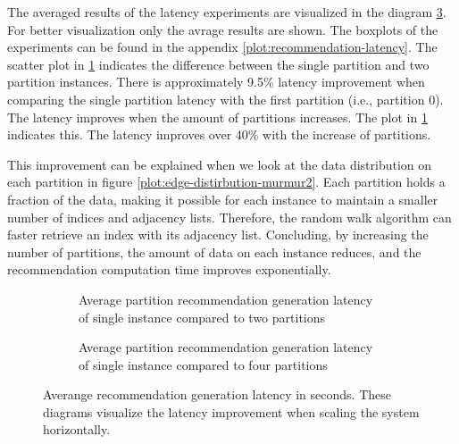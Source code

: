 The averaged results of the latency experiments are visualized in the diagram \ref{plot:average-recommendation-latency}. For better visualization only the avrage results are shown. The boxplots of the experiments can be found in the appendix \ref{plot:recommendation-latency}. The scatter plot in \ref{plot:average-recommendation-latency-two-partitions} indicates the difference between the single partition and two partition instances. There is approximately 9.5\% latency improvement when comparing the single partition latency with the first partition (i.e., partition 0). The latency improves when the amount of partitions increases. The plot in \ref{plot:average-recommendation-latency-two-partitions} indicates this. The latency improves over 40\% with the increase of partitions.

This improvement can be explained when we look at the data distribution on each partition in figure \ref{plot:edge-distirbution-murmur2}. Each partition holds a fraction of the data, making it possible for each instance to maintain a smaller number of indices and adjacency lists. Therefore, the random walk algorithm can faster retrieve an index with its adjacency list. Concluding, by increasing the number of partitions, the amount of data on each instance reduces, and the recommendation computation time improves exponentially.


\begin{figure}[!htb]
    \centering
    \begin{subfigure}{\textwidth}
        \centering
        
        \caption{Average partition recommendation generation latency of single instance compared to two partitions}
        \label{plot:average-recommendation-latency-two-partitions}
    \end{subfigure}\qquad

    \begin{subfigure}{\textwidth}
        \centering
        
        \caption{Average partition recommendation generation latency of single instance compared to four partitions}
        \label{plot:average-recommendation-latency-four-partitions}
    \end{subfigure}\qquad
    \caption{Averange recommendation generation latency in seconds. These diagrams visualize the latency improvement when scaling the system horizontally.}
    \label{plot:average-recommendation-latency}
\end{figure}



